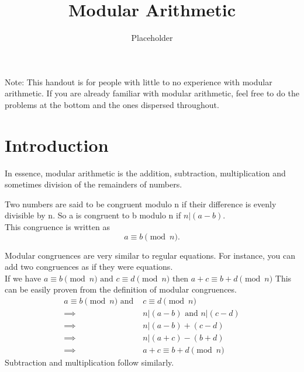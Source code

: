 \documentclass{article}
\begin{document}
\title{Modular Arithmetic}
\author{Placeholder}
\maketitle
Note: This handout is for people with little to no experience with modular arithmetic. If you are already familiar with modular arithmetic, feel free to do the problems at the bottom and the ones dispersed throughout.

\section*{Introduction}
\indent In essence, modular arithmetic is the addition, subtraction, multiplication and sometimes division 
of the remainders of numbers.

Two numbers are said to be congruent modulo n if their difference is evenly divisible by n.
So a is congruent to b modulo n if $n | (a-b)$. \\
This congruence is written as 
$$ a \equiv b \pmod{n}.$$

Modular congruences are very similar to regular equations. For instance, you can add two congruences as if they were equations.\\
If we have 
$
    a \equiv b \pmod{n} \text{ and } c \equiv d \pmod{n} \text{ then } a+c \equiv b+d \pmod{n}
$
This can be easily proven from the definition of modular congruences. 
\begin{align*}
    a \equiv b \pmod{n} \text{  and  } &c \equiv d \pmod{n}\\
    \implies &n|(a-b) \text{  and  } n|(c-d) \\
    \implies &n|(a-b)+(c-d)\\
    \implies &n|(a+c)-(b+d)\\
    \implies &\boxed{a+c \equiv b+d \pmod{n}}
\end{align*}
Subtraction and multiplication follow similarly.
\end{document}
